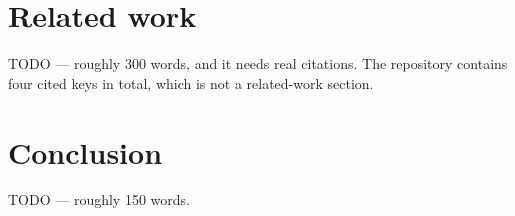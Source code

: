 \documentclass[10pt]{article}
\begin{document}


\section{Related work}
\label{sec:related}
TODO --- roughly 300 words, and it needs real citations. The repository
contains four cited keys in total, which is not a related-work section.

\section{Conclusion}
\label{sec:conclusion}
TODO --- roughly 150 words.



\end{document}
